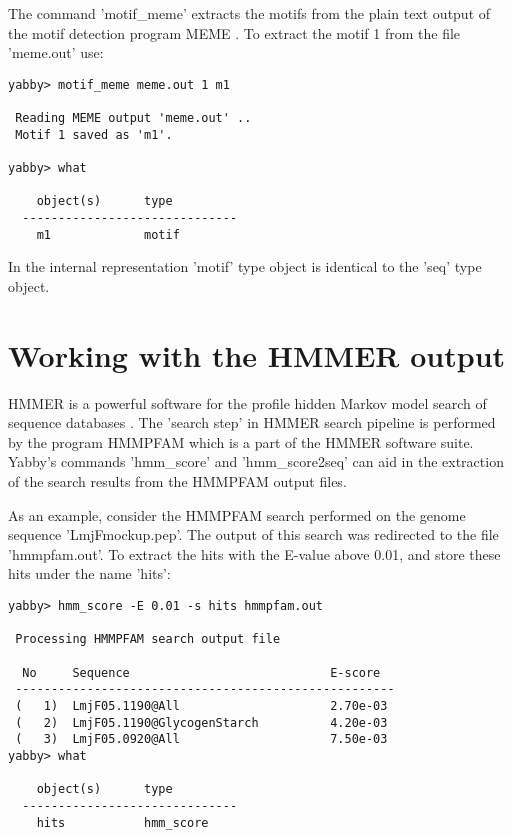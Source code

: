 
The command 'motif\_meme' extracts the motifs from the plain
text output of the motif detection program MEME \cite{meme}.
To extract the motif 1 from the file 'meme.out' use:

\begin{verbatim}
yabby> motif_meme meme.out 1 m1 

 Reading MEME output 'meme.out' ..
 Motif 1 saved as 'm1'.

yabby> what

    object(s)      type
  ------------------------------
    m1             motif         
\end{verbatim}

In the internal representation 'motif' type object is identical to
the 'seq' type object.

\section{Working with the HMMER output}


HMMER is a powerful software for the profile hidden Markov model
search of sequence databases \cite{hmmer,wwwhmmer}. The 'search 
step' in HMMER search pipeline is performed by the program
HMMPFAM which is a part of the HMMER software suite. Yabby's
commands 'hmm\_score' and 'hmm\_score2seq' can aid in the
extraction of the search results from the HMMPFAM output files.

As an example, consider the HMMPFAM search performed
on the genome sequence 'LmjFmockup.pep'. The output of this search
was redirected to the file 'hmmpfam.out'. To extract the hits
with the E-value above 0.01, and store these hits under the name
'hits':

\begin{verbatim}
yabby> hmm_score -E 0.01 -s hits hmmpfam.out

 Processing HMMPFAM search output file

  No     Sequence                            E-score
 -----------------------------------------------------
 (   1)  LmjF05.1190@All                     2.70e-03
 (   2)  LmjF05.1190@GlycogenStarch          4.20e-03
 (   3)  LmjF05.0920@All                     7.50e-03
yabby> what

    object(s)      type
  ------------------------------
    hits           hmm_score     
\end{verbatim}

